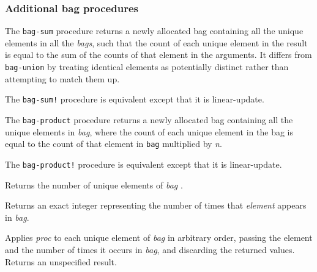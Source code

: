 \subsubsection{Additional bag procedures}

\begin{entry}{%
  }


  The \texttt{bag-sum} procedure returns a newly allocated bag
  containing all the unique elements in all the \emph{bags}, such that
  the count of each unique element in the result is equal to the sum
  of the counts of that element in the arguments. It differs from
  \texttt{bag-union} by treating identical elements as potentially
  distinct rather than attempting to match them up.

  The \texttt{bag-sum!} procedure is equivalent except that it is
  linear-update.
\end{entry}

\begin{entry}{%
  }

  The \texttt{bag-product} procedure returns a newly allocated bag
  containing all the unique elements in \emph{bag}, where the count of
  each unique element in the bag is equal to the count of that element
  in \texttt{bag} multiplied by \emph{n}.

  The \texttt{bag-product!} procedure is equivalent except that it is
  linear-update.
\end{entry}

\begin{entry}{%
  }

  Returns the number of unique elements of \emph{bag} .
\end{entry}

\begin{entry}{%
  }

  Returns an exact integer representing the number of times that
  \emph{element} appears in \emph{bag}.
\end{entry}

\begin{entry}{%
  }

  Applies \emph{proc} to each unique element of \emph{bag} in
  arbitrary order, passing the element and the number of times it
  occurs in \emph{bag}, and discarding the returned values. Returns an
  unspecified result.
\end{entry}

